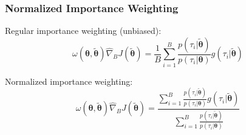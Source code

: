 \documentclass[aspectratio=169]{beamer}
\newcommand{\vtheta}{\boldsymbol{\theta}}
\begin{document}
\begin{frame} 
\frametitle{Normalized Importance Weighting} 

\begin{minipage}[]{.45\paperwidth}
Regular importance weighting (unbiased):
\begin{equation*}
	\omega(\vtheta,\widetilde{\vtheta})\widehat{\nabla}_B J(\widetilde{\vtheta}) = \frac{1}{B}\sum_{i=1}^B\frac{p(\tau_i\vert\widetilde{\vtheta})}{p(\tau_i\vert\vtheta)}g(\tau_i\vert\widetilde{\vtheta})
\end{equation*}
\vfill

Normalized importance weighting:
\begin{equation*}
\omega(\vtheta,\widetilde{\vtheta})\widehat{\nabla}_B J(\widetilde{\vtheta}) = \frac{\sum_{i=1}^B\frac{p(\tau_i\vert\widetilde{\vtheta})}{p(\tau_i\vert\vtheta)}g(\tau_i\vert\widetilde{\vtheta})}
	{\sum_{i=1}^B\frac{p(\tau_i\vert\widetilde{\vtheta})}{p(\tau_i\vert\vtheta)}}
\end{equation*}
\vfill


\end{minipage}
\end{frame}
\end{document}
